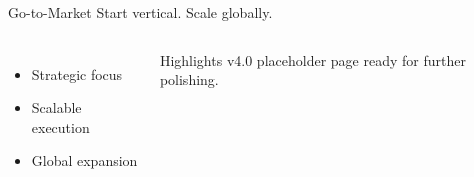 
\begin{frame}{Go-to-Market}
\vspace{0.3cm}
{\large Start vertical. Scale globally.}

\vspace{0.6cm}
\begin{columns}[T]
\begin{itemize}
\item Strategic focus
\item Scalable execution
\item Global expansion
\end{itemize}
\begin{block}{Highlights}
v4.0 placeholder page ready for further polishing.
\end{block}
\end{columns}
\end{frame}
